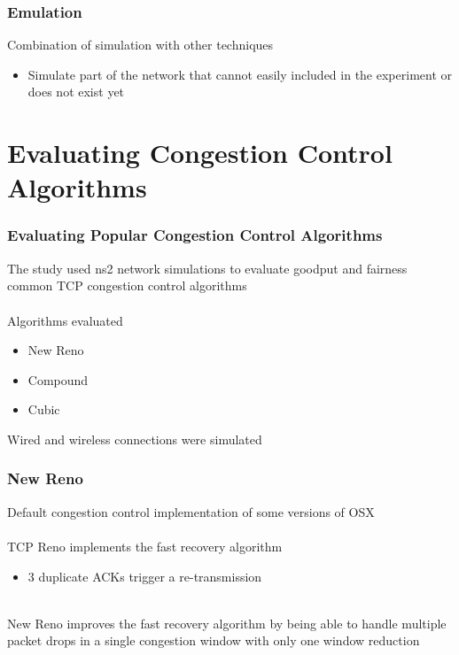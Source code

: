\documentclass{beamer}
\begin{document}
\begin{frame}
\frametitle{Emulation}
Combination of simulation with other techniques
\begin{itemize}
	\item Simulate part of the network that cannot easily included in the experiment or does not exist yet
\end{itemize}

\end{frame}

\section{Evaluating Congestion Control Algorithms}

\begin{frame}
\frametitle{Evaluating Popular Congestion Control Algorithms}
The study used ns2 network simulations to evaluate goodput and fairness common TCP congestion control algorithms\\~\\

Algorithms evaluated
\begin{itemize}
	\item New Reno
	\item Compound
	\item Cubic
\end{itemize}

Wired and wireless connections were simulated
\end{frame}

\begin{frame}
\frametitle{New Reno}
Default congestion control implementation of some versions of OSX\\~\\

TCP Reno implements the fast recovery algorithm
\begin{itemize}
	\item 3 duplicate ACKs trigger a re-transmission\\~\\
\end{itemize}

New Reno improves the fast recovery algorithm by being able to handle multiple packet drops in a single congestion window with only one window reduction
\end{frame}
\end{document}
